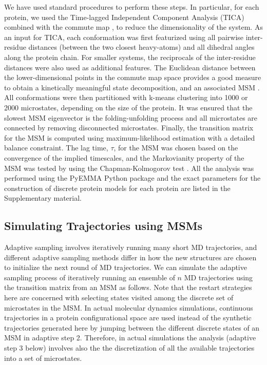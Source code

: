 We have used standard procedures to perform these steps. In particular, for
each protein, we used the Time-lagged Independent Component Analysis (TICA) 
\cite{TICA1-perez2013, TICA2-schwantes2013} combined with the commute map 
\cite{noe2016commute}, to reduce the dimensionality of the system. As an input
for TICA, each conformation was first featurized using all pairwise
inter-residue distances (between the two closest heavy-atoms) and all dihedral
angles along the protein chain.
For smaller systems, the reciprocals of the inter-residue distances were also
used as additional features. The Euclidean distance between the
lower-dimensional points in the commute map space provides a good measure to
obtain a kinetically meaningful state decomposition, and an associated MSM
\cite{noe2016commute}. All conformations were then
partitioned with k-means clustering into 1000 or 2000 microstates, depending on
the size of the protein. It was ensured that the slowest MSM eigenvector is the
folding-unfolding process and all microstates are connected by removing
disconnected microstates. Finally, the transition matrix for the MSM is
computed using maximum-likelihood estimation with a detailed balance
constraint. The lag time, $\tau$, for the MSM was chosen based on the
convergence of the implied timescales, and the Markovianity property of the MSM
was tested by using the Chapman-Kolmogorov test \cite{prinz2011markov}. All the
analysis was performed using the PyEMMA Python package \cite{scherer2015pyemma}
and the exact parameters for the construction of discrete protein models for
each protein are listed in the Supplementary material.

\subsection{\label{sec:level5}Simulating Trajectories using MSMs}

Adaptive sampling involves iteratively running many short MD trajectories, and
different adaptive sampling methods differ in how the new structures are chosen
to initialize the next round of MD trajectories. We can simulate the adaptive
sampling process of iteratively running an ensemble of $n$ MD trajectories 
using the transition matrix from an MSM as follows. 
Note that the restart strategies here are concerned with selecting states
visited among the discrete set of microstates in the MSM. 
In actual molecular dynamics simulations, continuous trajectories in a protein
configurational space are used instead of the synthetic trajectories generated here
by jumping between the different discrete states of an MSM in adaptive step 2.
Therefore, in actual simulations the analysis (adaptive step 3 below) involves also the
the discretization of all the available trajectories into a set of microstates.

